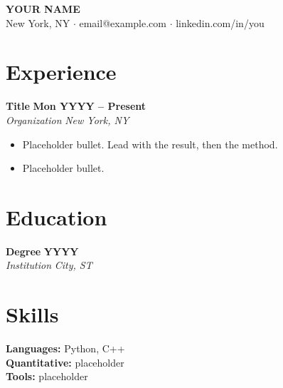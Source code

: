 \documentclass[letterpaper,10pt]{article}
\newcommand{\entry}[4]{%
  \noindent\textbf{#1} \hfill \textbf{#4}\\
  \textit{#2} \hfill \textit{#3}\vspace{0.2em}%
}
\begin{document}
\begin{center}
  {\LARGE\bfseries YOUR NAME}\\[0.3em]
  New York, NY $\cdot$ email@example.com $\cdot$ linkedin.com/in/you
\end{center}

\section{Experience}

\entry{Title}{Organization}{New York, NY}{Mon YYYY -- Present}
\begin{itemize}
  \item Placeholder bullet. Lead with the result, then the method.
  \item Placeholder bullet.
\end{itemize}

\section{Education}

\entry{Degree}{Institution}{City, ST}{YYYY}

\section{Skills}

\noindent
\textbf{Languages:} Python, C++ \\
\textbf{Quantitative:} placeholder \\
\textbf{Tools:} placeholder
\end{document}
